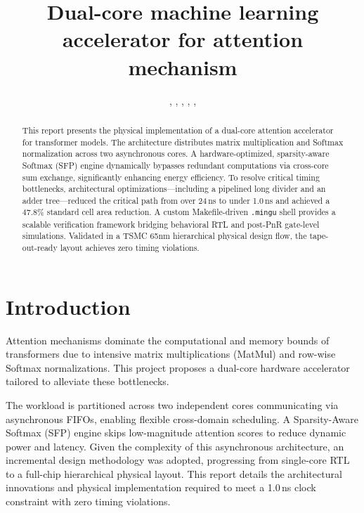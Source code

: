 \documentclass[journal]{IEEEtran}
\begin{document}
\title{Dual-core machine learning accelerator for attention mechanism}

\author{
    , 
    , 
    , 
    , 
    , 
}

\maketitle

\begin{abstract}
This report presents the physical implementation of a dual-core attention accelerator for transformer models. The architecture distributes matrix multiplication and Softmax normalization across two asynchronous cores. A hardware-optimized, sparsity-aware Softmax (SFP) engine dynamically bypasses redundant computations via cross-core sum exchange, significantly enhancing energy efficiency. To resolve critical timing bottlenecks, architectural optimizations—including a pipelined long divider and an adder tree—reduced the critical path from over 24\,ns to under 1.0\,ns and achieved a 47.8\% standard cell area reduction. A custom Makefile-driven \texttt{.mingu} shell provides a scalable verification framework bridging behavioral RTL and post-PnR gate-level simulations. Validated in a TSMC 65nm hierarchical physical design flow, the tape-out-ready layout achieves zero timing violations.
\end{abstract}

\section{Introduction}
Attention mechanisms dominate the computational and memory bounds of transformers due to intensive matrix multiplications (MatMul) and row-wise Softmax normalizations. This project proposes a dual-core hardware accelerator tailored to alleviate these bottlenecks.

The workload is partitioned across two independent cores communicating via asynchronous FIFOs, enabling flexible cross-domain scheduling. A Sparsity-Aware Softmax (SFP) engine skips low-magnitude attention scores to reduce dynamic power and latency. Given the complexity of this asynchronous architecture, an incremental design methodology was adopted, progressing from single-core RTL to a full-chip hierarchical physical layout. This report details the architectural innovations and physical implementation required to meet a 1.0\,ns clock constraint with zero timing violations.
\end{document}
